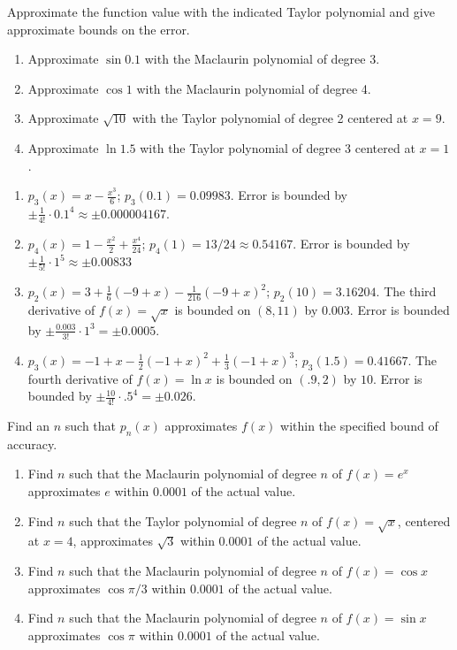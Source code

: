 \begin{enumialphparenastyle}
\begin{ex}
\end{ex}

\begin{ex}
Approximate the function value with the indicated Taylor polynomial and give approximate bounds on the error.
\begin{enumerate}
\item {Approximate $\sin 0.1$ with the Maclaurin polynomial of degree 3.
}
\item {Approximate $\cos 1$ with the Maclaurin polynomial of degree 4.
}
\item {Approximate $\sqrt{10}$ with the Taylor polynomial of degree 2 centered at $x=9$.
}
\item {Approximate $\ln1.5$ with the Taylor polynomial of degree 3 centered at $x=1$.
}
\end{enumerate}

\begin{sol}
\begin{enumerate}
\item 
{$p_3(x) =x-\frac{x^3}{6}$; $p_3(0.1) = 0.09983$. Error is bounded by $\pm \frac{1}{4!}\cdot0.1^4 \approx \pm 0.000004167$.
}
\item 
{$p_4(x) =1-\frac{x^2}{2}+\frac{x^4}{24}$; $p_4(1) = 13/24\approx 0.54167$. Error is bounded by $\pm \frac{1}{5!}\cdot1^5 \approx \pm 0.00833$
}
\item 
{$p_2(x) =3+\frac{1}{6} (-9+x)-\frac{1}{216} (-9+x)^2$; $p_2(10) =  3.16204$. The third derivative of $f(x) =\sqrt x$ is bounded on $(8,11)$ by $0.003$. Error is bounded by $\pm \frac{0.003}{3!}\cdot1^3 = \pm 0.0005.$
}
\item 
{$p_3(x) =-1+x-\frac{1}{2} (-1+x)^2+\frac{1}{3} (-1+x)^3$; $p_3(1.5) =  0.41667$. The fourth derivative of $f(x) =\ln x$ is bounded on $(.9,2)$ by $10$. Error is bounded by $\pm \frac{10}{4!}\cdot.5^4 = \pm 0.026.$
}
\end{enumerate}
\end{sol}

\end{ex}

\begin{ex}
Find an $n$  such that $p_n(x)$ approximates $f(x)$ within the specified bound of accuracy.
\begin{enumerate}
\item {Find $n$ such that the  Maclaurin polynomial of degree $n$ of $f(x)= e^x$ approximates $e$ within $0.0001$ of the actual value.
}
\item {Find $n$ such that the  Taylor polynomial of degree $n$ of $f(x)= \sqrt x$, centered at $x=4$, approximates $\sqrt 3$ within $0.0001$ of the actual value.
}
\item {Find $n$ such that the  Maclaurin polynomial of degree $n$ of $f(x)= \cos x$ approximates $\cos \pi/3$ within $0.0001$ of the actual value.
}
\item {Find $n$ such that the  Maclaurin polynomial of degree $n$ of $f(x)= \sin x$ approximates $\cos \pi$ within $0.0001$ of the actual value.
}
\end{enumerate}


\end{ex}
\end{enumialphparenastyle}
